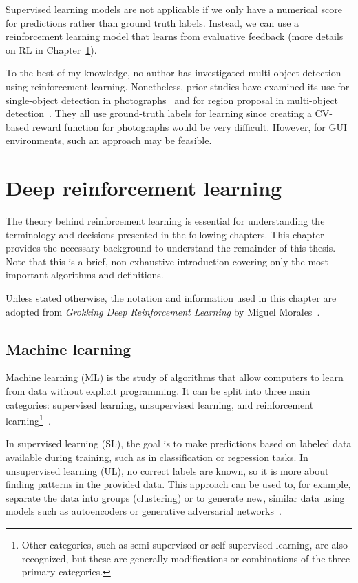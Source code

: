 \documentclass[
  digital,     %
  oneside,     %
  nosansbold,  %
  nocolorbold, %
  lof,         %
  lot,         %
]{fithesis4}
\begin{document}
Supervised learning models are not applicable if we only have a numerical score for predictions rather than ground truth labels. Instead, we can use a reinforcement learning model that learns from evaluative feedback (more details on RL in Chapter~\ref{ch:dlr}).

To the best of my knowledge, no author has investigated multi-object detection using reinforcement learning. Nonetheless, prior studies have examined its use for single-object detection in photographs~\cite{iterative_od_with_rl, hierarchical_od_with_drl} and for region proposal in multi-object detection~\cite{drl_rpn}. They all use ground-truth labels for learning since creating a CV-based reward function for photographs would be very difficult. However, for GUI environments, such an approach may be feasible.

\chapter{Deep reinforcement learning}
\label{ch:dlr}

The theory behind reinforcement learning is essential for understanding the terminology and decisions presented in the following chapters. This chapter provides the necessary background to understand the remainder of this thesis. Note that this is a brief, non-exhaustive introduction covering only the most important algorithms and definitions.

Unless stated otherwise, the notation and information used in this chapter are adopted from \textit{Grokking Deep Reinforcement Learning} by Miguel Morales~\cite{GDRL}.

\section{Machine learning}
Machine learning (ML) is the study of algorithms that allow computers to learn from data without explicit programming. It can be split into three main categories: supervised learning, unsupervised learning, and reinforcement learning\footnote{Other categories, such as semi-supervised or self-supervised learning, are also recognized, but these are generally modifications or combinations of the three primary categories.}~\cite{IB031}.

In supervised learning (SL), the goal is to make predictions based on labeled data available during training, such as in classification or regression tasks. In unsupervised learning (UL), no correct labels are known, so it is more about finding patterns in the provided data. This approach can be used to, for example, separate the data into groups (clustering) or to generate new, similar data using models such as autoencoders or generative adversarial networks~\cite{IB031, PV021}.
\end{document}
